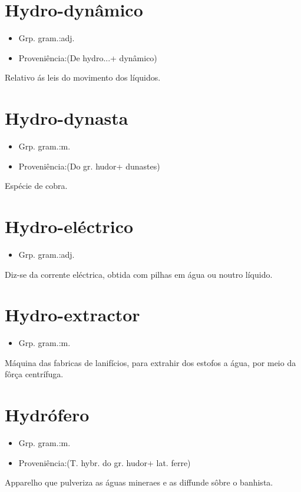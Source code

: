 \documentclass{article}
\begin{document}
\section{Hydro-dynâmico}
\begin{itemize}
\item {Grp. gram.:adj.}
\end{itemize}
\begin{itemize}
\item {Proveniência:(De \textunderscore hydro...\textunderscore  + \textunderscore dynâmico\textunderscore )}
\end{itemize}
Relativo ás leis do movimento dos líquidos.
\section{Hydro-dynasta}
\begin{itemize}
\item {Grp. gram.:m.}
\end{itemize}
\begin{itemize}
\item {Proveniência:(Do gr. \textunderscore hudor\textunderscore  + \textunderscore dunastes\textunderscore )}
\end{itemize}
Espécie de cobra.
\section{Hydro-eléctrico}
\begin{itemize}
\item {Grp. gram.:adj.}
\end{itemize}
Diz-se da corrente eléctrica, obtida com pilhas em água ou noutro líquido.
\section{Hydro-extractor}
\begin{itemize}
\item {Grp. gram.:m.}
\end{itemize}
Máquina das fabricas de lanifícios, para extrahir dos estofos a água, por meio da fôrça centrífuga.
\section{Hydrófero}
\begin{itemize}
\item {Grp. gram.:m.}
\end{itemize}
\begin{itemize}
\item {Proveniência:(T. hybr. do gr. \textunderscore hudor\textunderscore  + lat. \textunderscore ferre\textunderscore )}
\end{itemize}
Apparelho que pulveriza as águas mineraes e as diffunde sôbre o banhista.
\end{document}
